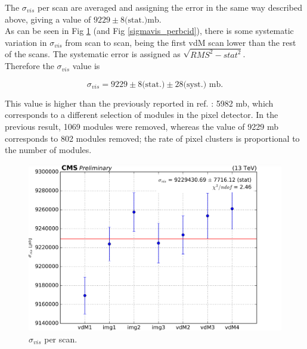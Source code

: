 The $\sigma_{vis}$ per scan are averaged and assigning the error in the same way described above, giving a value of $9229 \pm 8 \text{(stat.)} \text{mb}$.\\
As can be seen in  Fig \ref{sigmavis_perscan}  (and Fig \ref{sigmavis_perbcid}), there is some systematic variation in $\sigma_{vis}$ from scan to scan, being the first vdM scan lower than the rest of the scans. The systematic error is assigned as $\sqrt{RMS^{2}-stat^{2}}$. \\
Therefore the $\sigma_{vis}$ value is

\begin{equation}
\sigma_{vis} = 9229 \pm 8 \text{(stat.)} \pm 28 \text{(syst.)} \text{ mb} .
\end{equation}

This value is higher than the previously reported in ref. \cite{pas_18}: 5982 mb, which corresponds to a different selection of modules in the pixel detector. In the previous result, 1069 modules were removed, whereas the value of 9229 mb corresponds to 802 modules removed; the rate of pixel clusters is proportional to the number of modules.

\begin{center}
  \begin{figure}[ht]
    \centering
    \includegraphics[scale=0.37]{Chapter4/plots/xsec_perscan_v2.png}
    \caption[$\sigma_{vis}$ per Scan]{ $\sigma_{vis}$  per scan.} %
    \label{sigmavis_perscan}
  \end{figure}
\end{center}
